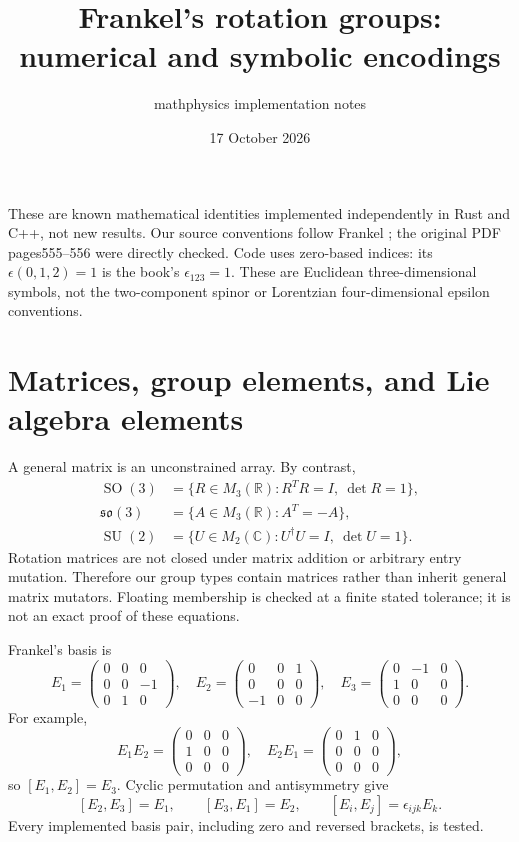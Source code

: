 \documentclass{article}
\newcommand{\R}{\mathbb{R}}
\newcommand{\SU}{\operatorname{SU}}
\newcommand{\SO}{\operatorname{SO}}
\newcommand{\so}{\mathfrak{so}}
\begin{document}
\title{Frankel's rotation groups: numerical and symbolic encodings}
\author{mathphysics implementation notes}
\date{17 October 2026}
\maketitle
These are known mathematical identities implemented independently in Rust
and C++, not new results. Our source conventions follow Frankel
\cite[pp.~492--493, Eqs.~(19.1)--(19.6)]{Frankel};
the original PDF pages555--556 were directly checked.
Code uses zero-based indices: its $\epsilon(0,1,2)=1$ is the book's
$\epsilon_{123}=1$. These are Euclidean three-dimensional symbols, not the
two-component spinor or Lorentzian four-dimensional epsilon conventions.

\section{Matrices, group elements, and Lie algebra elements}
A general matrix is an unconstrained array. By contrast,
\begin{align*}
\SO(3)&=\{R\in M_3(\R):R^TR=I,\ \det R=1\},\\
\so(3)&=\{A\in M_3(\R):A^T=-A\},\\
\SU(2)&=\{U\in M_2(\mathbb C):U^\dagger U=I,\ \det U=1\}.
\end{align*}
Rotation matrices are not closed under matrix addition or arbitrary entry
mutation. Therefore our group types contain matrices rather than inherit
general matrix mutators. Floating membership is checked at a finite stated
tolerance; it is not an exact proof of these equations.

Frankel's basis is
\[
 E_1=\begin{pmatrix}0&0&0\\0&0&-1\\0&1&0\end{pmatrix},\quad
 E_2=\begin{pmatrix}0&0&1\\0&0&0\\-1&0&0\end{pmatrix},\quad
 E_3=\begin{pmatrix}0&-1&0\\1&0&0\\0&0&0\end{pmatrix}.
\]
For example,
\[
 E_1E_2=\begin{pmatrix}0&0&0\\1&0&0\\0&0&0\end{pmatrix},\quad
 E_2E_1=\begin{pmatrix}0&1&0\\0&0&0\\0&0&0\end{pmatrix},
\]
so $[E_1,E_2]=E_3$. Cyclic permutation and antisymmetry give
\[
 [E_2,E_3]=E_1,\qquad [E_3,E_1]=E_2,\qquad
 [E_i,E_j]=\epsilon_{ijk}E_k .
\]
Every implemented basis pair, including zero and reversed brackets, is tested.
\end{document}
